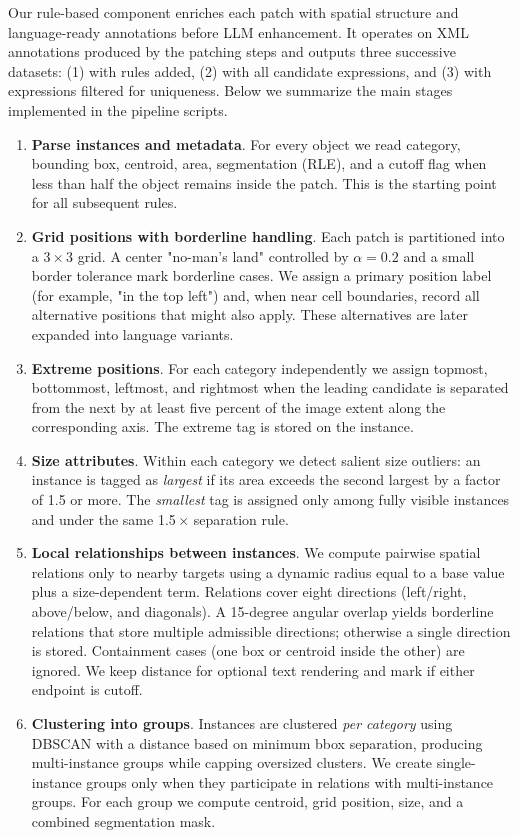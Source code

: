 Our rule-based component enriches each patch with spatial structure and language-ready annotations before LLM enhancement. It operates on XML annotations produced by the patching steps and outputs three successive datasets: (1) with rules added, (2) with all candidate expressions, and (3) with expressions filtered for uniqueness. Below we summarize the main stages implemented in the pipeline scripts.

\begin{enumerate}
    \item \textbf{Parse instances and metadata}. For every object we read category, bounding box, centroid, area, segmentation (RLE), and a cutoff flag when less than half the object remains inside the patch. This is the starting point for all subsequent rules.
    \item \textbf{Grid positions with borderline handling}. Each patch is partitioned into a 3\,\(\times\,\)3 grid. A center "no-man's land" controlled by \(\alpha = 0.2\) and a small border tolerance mark borderline cases. We assign a primary position label (for example, "in the top left") and, when near cell boundaries, record all alternative positions that might also apply. These alternatives are later expanded into language variants.
    \item \textbf{Extreme positions}. For each category independently we assign topmost, bottommost, leftmost, and rightmost when the leading candidate is separated from the next by at least five percent of the image extent along the corresponding axis. The extreme tag is stored on the instance.
    \item \textbf{Size attributes}. Within each category we detect salient size outliers: an instance is tagged as \emph{largest} if its area exceeds the second largest by a factor of 1.5 or more. The \emph{smallest} tag is assigned only among fully visible instances and under the same 1.5\,\(\times\) separation rule.
    \item \textbf{Local relationships between instances}. We compute pairwise spatial relations only to nearby targets using a dynamic radius equal to a base value plus a size-dependent term. Relations cover eight directions (left/right, above/below, and diagonals). A 15-degree angular overlap yields borderline relations that store multiple admissible directions; otherwise a single direction is stored. Containment cases (one box or centroid inside the other) are ignored. We keep distance for optional text rendering and mark if either endpoint is cutoff.
    \item \textbf{Clustering into groups}. Instances are clustered \emph{per category} using DBSCAN with a distance based on minimum bbox separation, producing multi-instance groups while capping oversized clusters. We create single-instance groups only when they participate in relations with multi-instance groups. For each group we compute centroid, grid position, size, and a combined segmentation mask.

\end{enumerate}
